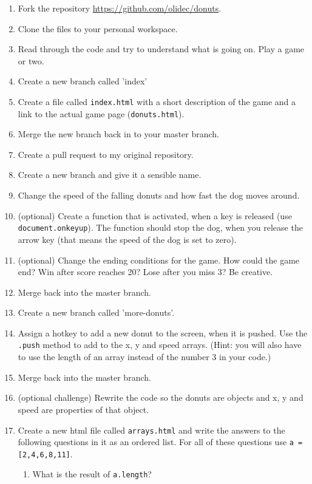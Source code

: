 \documentclass[11pt,a4paper]{report}
\begin{document}
\begin{ex}
\begin{enumerate}
\item Fork the repository \url{https://github.com/olidec/donuts}.
\item Clone the files to your personal workspace.
\item Read through the code and try to understand what is going on. Play a game or two.
\item Create a new branch called 'index'
\item Create a file called \verb|index.html| with a short description of the game and a link to the actual game page (\verb|donuts.html|).
\item Merge the new branch back in to your master branch.
\item Create a pull request to my original repository.
\item Create a new branch and give it a sensible name.
\item Change the speed of the falling donuts and how fast the dog moves around.
\item (optional) Create a function that is activated, when a key is released (use \verb|document.onkeyup|).  The function should stop the dog, when you release the arrow key (that means the speed of the dog is set to zero).
\item (optional) Change the ending conditions for the game. How could the game end? Win after score reaches 20? Lose after you miss 3? Be creative.
\item Merge back into the master branch.
\item Create a new branch called 'more-donuts'.
\item Assign a hotkey to add a new donut to the screen, when it is pushed. Use the \verb|.push| method to add to the x, y and speed arrays. (Hint: you will also have to use the length of an array instead of the number $3$ in your code.)
\item Merge back into the master branch.
\item (optional challenge) Rewrite the code so the donuts are objects and x, y and speed are properties of that object.
\item Create a new html file called \verb|arrays.html| and write the answers to the following questions in it as an ordered list. For all of these questions use \verb|a = [2,4,6,8,11]|.
\begin{enumerate}
\item What is the result of \verb|a.length|?

\end{enumerate}
\end{enumerate}
\end{ex}
\end{document}

